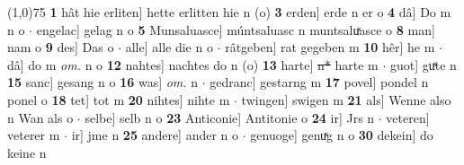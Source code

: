 \documentclass[8pt,a4paper,notitlepage]{article}
\begin{document}
\begin{table}[ht]
\begin{minipage}[t]{0.5\linewidth}
\line(1,0){75} \newline
\textbf{1} hât hie erliten] hette erlitten hie n (o) \textbf{3} erden] erde n er o \textbf{4} dâ] Do m n o  $\cdot$ engelac] gelag n o \textbf{5} Munsaluasce] múntsaluasc n muntsaluͯasce o \textbf{8} man] nam o \textbf{9} des] Das o  $\cdot$ alle] alle die n o  $\cdot$ râtgeben] rat gegeben m \textbf{10} hêr] he m  $\cdot$ dâ] do m \textit{om.} n o \textbf{12} nahtes] nachtes do n (o) \textbf{13} harte] \sout{n*} harte m  $\cdot$ guot] guͯte n \textbf{15} sanc] gesang n o \textbf{16} was] \textit{om.} n  $\cdot$ gedranc] gestarng m \textbf{17} povel] pondel n ponel o \textbf{18} tet] tot m \textbf{20} nihtes] nihte m  $\cdot$ twingen] swigen m \textbf{21} als] Wenne also n Wan als o  $\cdot$ selbe] selb n o \textbf{23} Anticonie] Antitonie o \textbf{24} ir] Jrs n  $\cdot$ veteren] veterer m  $\cdot$ ir] jme n \textbf{25} andere] ander n o  $\cdot$ genuoge] genuͯg n o \textbf{30} dekein] do keine n \newline
\end{minipage}
\end{table}
\newpage
\end{document}

